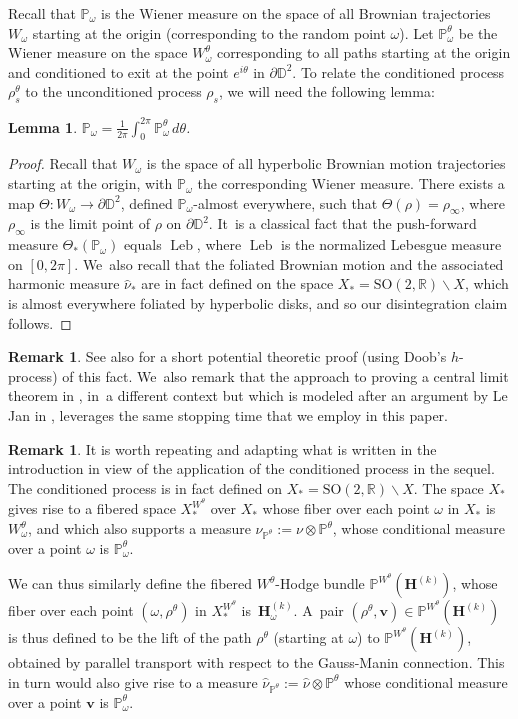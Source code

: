 \documentclass[10pt]{amsart}
\DeclareMathOperator{\Leb}{Leb}
\theoremstyle{plain}
\newtheorem{lemma}[thm]{Lemma}
\theoremstyle{definition}
\newtheorem{rem}[thm]{Remark}
\numberwithin{equation}{subsection}
\newcommand\bD{\mathbb{D}}
\newcommand\bP{\mathbb{P}}
\newcommand\bR{\mathbb{R}}\let\R\bR
\newcommand{\SO}{\mathrm{SO}}
\newcommand{\bfH}{\boldsymbol{H}}
\newcommand{\bfv}{\boldsymbol{v}}
\newcommand{\defeq}{:=}
\let\dpl\displaystyle
\begin{document}
Recall that $\bP_{\omega}$ is the Wiener measure on the space of all Brownian trajectories~$W_\omega$ starting at the origin (corresponding to the random point $\omega$). Let $\bP^\theta_{\omega}$ be the Wiener measure on the space $W^\theta_\omega$ corresponding to all paths starting at the origin and conditioned to exit at the point $e^{i \theta}$ in $\partial \bD^2$. To relate the conditioned process $\rho_s^\theta$ to the unconditioned process $\rho_s$, we will need the following lemma:
\begin{lemma}\label{disintegration}
$\dpl
\bP_\omega = \frac{1}{2\pi}\int_{0}^{2\pi}\bP^{\theta}_{\omega}\, d\theta$.
\end{lemma}
\begin{proof}
Recall that $W_\omega$ is the space of all hyperbolic Brownian motion trajectories starting at the origin, with $\bP_\omega$ the corresponding Wiener measure. There exists a map $\Theta : W_\omega \to \partial \bD^2$, defined $\bP_\omega$-almost everywhere, such that $\Theta(\rho) = \rho_{\infty}$, where $\rho_\infty$ is the limit point of $\rho$ on $\partial \bD^2$. It~is a classical fact that the push-forward measure $\Theta_{\ast}(\bP_\omega)$ equals $\Leb$, where $\Leb$ is the normalized Lebesgue measure on $[0,2\pi]$. We~also recall that the foliated Brownian motion and the associated harmonic measure $\hat{\nu}_*$ are in fact defined on the space $X_*=\SO(2,\bR)\backslash X$, which is almost everywhere foliated by hyperbolic disks, and so our disintegration claim follows.
\end{proof}
\begin{rem}
See also \cite[Lem.\,8]{Fran05} for a short potential theoretic proof (using Doob's $h$-process) of this fact. We~also remark that the approach to proving a central limit theorem in \cite{Fran05}, in~a different context but which is modeled after an argument by Le Jan in \cite{L94}, leverages the same stopping time that we employ in this paper.
\end{rem}

\begin{rem}
It is worth repeating and adapting what is written in the introduction in view of the application of the conditioned process in the sequel. The conditioned process is in fact defined on $X_* = \SO(2,\bR)\backslash X$. The space $X_*$ gives rise to a fibered space $X^{W^\theta}_*$ over $X_*$ whose fiber over each point $\omega$ in $X_*$ is $W^\theta_\omega$, and which also supports a measure $\nu_{\bP^\theta}\defeq\nu\otimes \bP^\theta$, whose conditional measure over a point $\omega$
is $\bP^\theta_\omega$.

We can thus similarly define the fibered $W^\theta$-Hodge bundle $\bP^{W^\theta}(\bfH^{(k)})$, whose fiber over each point $(\omega,\rho^\theta)$ in $X^{W^\theta}_*$ is~$\bfH^{(k)}_\omega$. A~pair $(\rho^\theta,\bfv) \in \bP^{W^\theta}(\bfH^{(k)})$ is thus defined to be the lift of the path $\rho^\theta$ (starting at $\omega$) to $\bP^{W^\theta}(\bfH^{(k)})$, obtained by parallel transport with respect to the Gauss-Manin connection. This in turn would also give rise to a measure $\hat{\nu}_{\bP^\theta}\defeq\hat{\nu}\otimes \bP^\theta$ whose conditional measure over a point $\bfv$ is $\bP^\theta_\omega$.
\end{rem}
\end{document}
